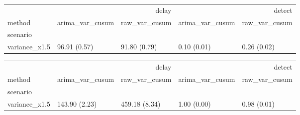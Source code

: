 \begin{tabular}{lllll}
\toprule
 & \multicolumn{2}{r}{delay} & \multicolumn{2}{r}{detect} \\
method & arima_var_cusum & raw_var_cusum & arima_var_cusum & raw_var_cusum \\
scenario &  &  &  &  \\
\midrule
variance_x1.5 & 96.91 (0.57) & 91.80 (0.79) & 0.10 (0.01) & 0.26 (0.02) \\
\bottomrule
\end{tabular}

\begin{tabular}{lllll}
\toprule
 & \multicolumn{2}{r}{delay} & \multicolumn{2}{r}{detect} \\
method & arima_var_cusum & raw_var_cusum & arima_var_cusum & raw_var_cusum \\
scenario &  &  &  &  \\
\midrule
variance_x1.5 & 143.90 (2.23) & 459.18 (8.34) & 1.00 (0.00) & 0.98 (0.01) \\
\bottomrule
\end{tabular}
